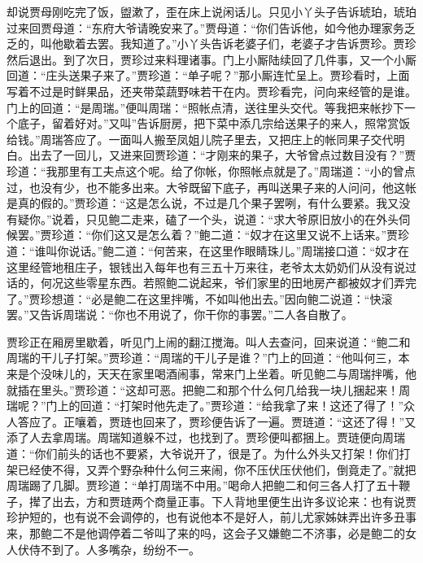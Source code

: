 \begin{parag}
    却说贾母刚吃完了饭，盥漱了，歪在床上说闲话儿。只见小丫头子告诉琥珀，琥珀过来回贾母道：“东府大爷请晚安来了。”贾母道：“你们告诉他，如今他办理家务乏乏的，叫他歇着去罢。我知道了。”小丫头告诉老婆子们，老婆子才告诉贾珍。贾珍然后退出。到了次日，贾珍过来料理诸事。门上小厮陆续回了几件事，又一个小厮回道：“庄头送果子来了。”贾珍道：“单子呢？”那小厮连忙呈上。贾珍看时，上面写着不过是时鲜果品，还夹带菜蔬野味若干在内。贾珍看完，问向来经管的是谁。门上的回道：“是周瑞。”便叫周瑞：“照帐点清，送往里头交代。等我把来帐抄下一个底子，留着好对。”又叫”告诉厨房，把下菜中添几宗给送果子的来人，照常赏饭给钱。”周瑞答应了。一面叫人搬至凤姐儿院子里去，又把庄上的帐同果子交代明白。出去了一回儿，又进来回贾珍道：“才刚来的果子，大爷曾点过数目没有？”贾珍道：“我那里有工夫点这个呢。给了你帐，你照帐点就是了。”周瑞道：“小的曾点过，也没有少，也不能多出来。大爷既留下底子，再叫送果子来的人问问，他这帐是真的假的。”贾珍道：“这是怎么说，不过是几个果子罢咧，有什么要紧。我又没有疑你。”说着，只见鲍二走来，磕了一个头，说道：“求大爷原旧放小的在外头伺候罢。”贾珍道：“你们这又是怎么着？”鲍二道：“奴才在这里又说不上话来。”贾珍道：“谁叫你说话。”鲍二道：“何苦来，在这里作眼睛珠儿。”周瑞接口道：“奴才在这里经管地租庄子，银钱出入每年也有三五十万来往，老爷太太奶奶们从没有说过话的，何况这些零星东西。若照鲍二说起来，爷们家里的田地房产都被奴才们弄完了。”贾珍想道：“必是鲍二在这里拌嘴，不如叫他出去。”因向鲍二说道：“快滚罢。”又告诉周瑞说：“你也不用说了，你干你的事罢。”二人各自散了。
\end{parag}


\begin{parag}
    贾珍正在厢房里歇着，听见门上闹的翻江搅海。叫人去查问，回来说道：“鲍二和周瑞的干儿子打架。”贾珍道：“周瑞的干儿子是谁？”门上的回道：“他叫何三，本来是个没味儿的，天天在家里喝酒闹事，常来门上坐着。听见鲍二与周瑞拌嘴，他就插在里头。”贾珍道：“这却可恶。把鲍二和那个什么何几给我一块儿捆起来！周瑞呢？”门上的回道：“打架时他先走了。”贾珍道：“给我拿了来！这还了得了！”众人答应了。正嚷着，贾琏也回来了，贾珍便告诉了一遍。贾琏道：“这还了得！”又添了人去拿周瑞。周瑞知道躲不过，也找到了。贾珍便叫都捆上。贾琏便向周瑞道：“你们前头的话也不要紧，大爷说开了，很是了。为什么外头又打架！你们打架已经使不得，又弄个野杂种什么何三来闹，你不压伏压伏他们，倒竟走了。”就把周瑞踢了几脚。贾珍道：“单打周瑞不中用。”喝命人把鲍二和何三各人打了五十鞭子，撵了出去，方和贾琏两个商量正事。下人背地里便生出许多议论来：也有说贾珍护短的，也有说不会调停的，也有说他本不是好人，前儿尤家姊妹弄出许多丑事来，那鲍二不是他调停着二爷叫了来的吗，这会子又嫌鲍二不济事，必是鲍二的女人伏侍不到了。人多嘴杂，纷纷不一。
\end{parag}


